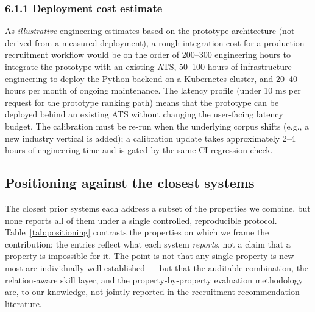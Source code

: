 \subsubsection*{6.1.1 Deployment cost estimate}
As \emph{illustrative} engineering estimates based on the prototype architecture (not derived from a measured deployment), a rough integration cost for a production recruitment workflow would be on the order of 200--300 engineering hours to integrate the prototype with an existing ATS, 50--100 hours of infrastructure engineering to deploy the Python backend on a Kubernetes cluster, and 20--40 hours per month of ongoing maintenance.
The latency profile (under 10 ms per request for the prototype ranking path) means that the prototype can be deployed behind an existing ATS without changing the user-facing latency budget.
The calibration must be re-run when the underlying corpus shifts (e.g., a new industry vertical is added); a calibration update takes approximately 2--4 hours of engineering time and is gated by the same CI regression check.

\subsection{Positioning against the closest systems}\label{sec:6.pos}
The closest prior systems each address a subset of the properties we combine, but none reports all of them under a single controlled, reproducible protocol. Table~\ref{tab:positioning} contrasts the properties on which we frame the contribution; the entries reflect what each system \emph{reports}, not a claim that a property is impossible for it. The point is not that any single property is new --- most are individually well-established --- but that the auditable combination, the relation-aware skill layer, and the property-by-property evaluation methodology are, to our knowledge, not jointly reported in the recruitment-recommendation literature.

